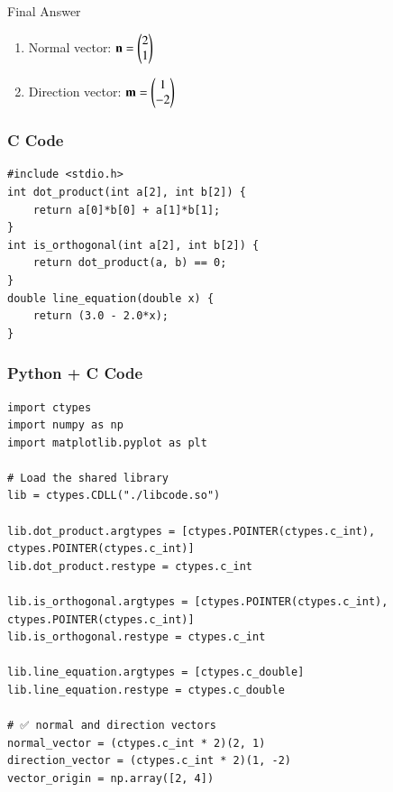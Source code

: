 \documentclass{beamer}
\begin{document}
\begin{frame}{Final Answer}
\begin{enumerate}
    \item Normal vector: $\mathbf{n} = \begin{pmatrix}2 \\ 1\end{pmatrix}$
    \item Direction vector: $\mathbf{m} = \begin{pmatrix}1 \\ -2\end{pmatrix}$
\end{enumerate}
\end{frame}

\begin{frame}[fragile]
    \frametitle{C Code }

    \begin{lstlisting}
#include <stdio.h>
int dot_product(int a[2], int b[2]) {
    return a[0]*b[0] + a[1]*b[1];
}
int is_orthogonal(int a[2], int b[2]) {
    return dot_product(a, b) == 0;
}
double line_equation(double x) {
    return (3.0 - 2.0*x);
}
    \end{lstlisting}
\end{frame}

\begin{frame}[fragile]
    \frametitle{Python + C Code }

    \begin{lstlisting}
import ctypes
import numpy as np
import matplotlib.pyplot as plt

# Load the shared library
lib = ctypes.CDLL("./libcode.so")

lib.dot_product.argtypes = [ctypes.POINTER(ctypes.c_int), ctypes.POINTER(ctypes.c_int)]
lib.dot_product.restype = ctypes.c_int

lib.is_orthogonal.argtypes = [ctypes.POINTER(ctypes.c_int), ctypes.POINTER(ctypes.c_int)]
lib.is_orthogonal.restype = ctypes.c_int

lib.line_equation.argtypes = [ctypes.c_double]
lib.line_equation.restype = ctypes.c_double

# ✅ normal and direction vectors
normal_vector = (ctypes.c_int * 2)(2, 1)
direction_vector = (ctypes.c_int * 2)(1, -2)
vector_origin = np.array([2, 4])

    \end{lstlisting}
\end{frame}
\end{document}

